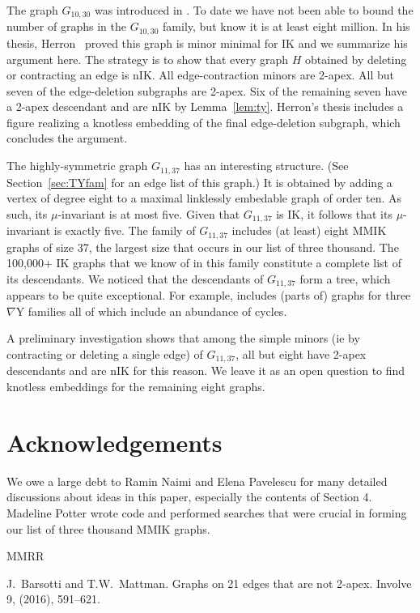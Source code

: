 \documentclass{amsart}
\theoremstyle{remark}
\newcommand{\ty}{\nabla\mathrm{Y}}
\begin{document}
{The graph $G_{10,30}$ was introduced in \cite{MNPP}. To date we have not been able to bound the number of
graphs in the $G_{10,30}$ family, but know it is at least eight million.
In his thesis, Herron~\cite{H} proved this graph is minor minimal for IK and we
summarize his argument here. The strategy is to show that every 
graph $H$ obtained by deleting or contracting an edge is nIK.
All edge-contraction minors are 2-apex. All but seven of the edge-deletion subgraphs are 2-apex. Six of the remaining seven have a 2-apex descendant and are nIK by Lemma~\ref{lem:ty}.
Herron's thesis includes a figure realizing a knotless embedding of
the final edge-deletion subgraph, which concludes the argument.

The highly-symmetric graph $G_{11,37}$ has an interesting structure. (See Section~\ref{sec:TYfam} for an edge list of this graph.) It is obtained by adding a vertex of degree eight to a maximal linklessly embedable graph of order ten. As such, its $\mu$-invariant is at most five. Given that $G_{11,37}$ is IK, it follows that its $\mu$-invariant is exactly five. The family of $G_{11,37}$ includes (at least) eight MMIK graphs of size 37, the largest size that occurs in our list of three thousand. 
The 100,000+ IK graphs that we know of in this family constitute a complete list of its descendants. 
We noticed that the descendants of
$G_{11,37}$ form a tree, which appears to be 
quite exceptional. 
For example, \cite{GMN} includes (parts of) graphs for three $\ty$ families
all of which include an abundance of cycles.

A preliminary investigation shows that among the simple minors (ie by contracting or deleting a single edge) of 
$G_{11,37}$, all but eight have 2-apex descendants and are nIK for this reason. We leave it as an open question to find knotless embeddings for the remaining eight graphs.

\section*{Acknowledgements}
We owe a large debt to Ramin Naimi and Elena Pavelescu for many detailed discussions about ideas in this paper, especially the contents of Section 4. Madeline Potter wrote code and performed searches that were 
crucial in forming our list of three thousand MMIK graphs.

\begin{thebibliography}{MMRR}

 J.~Barsotti and T.W.~Mattman. Graphs on 21 edges that are not 2-apex.
Involve  9,  (2016), 591--621.


\end{thebibliography}}
\end{document}
